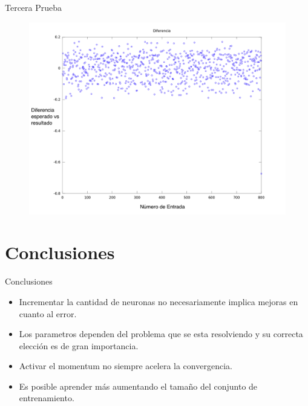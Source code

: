 \documentclass{beamer}
\begin{document}
\begin{frame}{Tercera Prueba}
\begin{figure}[H]
\begin{center}
\includegraphics[scale=0.20]{images/t2-14/diferencia_final.png}
\label{modelado}
\end{center}
\end{figure}
\end{frame}


\section{Conclusiones}
\begin{frame}{Conclusiones}

\begin{itemize}
\item Incrementar la cantidad de neuronas no necesariamente 
implica mejoras en cuanto al error.
\item Los parametros dependen del problema que se esta resolviendo y su correcta elección es de gran importancia.
\item Activar el momentum no siempre acelera la convergencia.
\item Es posible aprender más aumentando el tamaño del conjunto de entrenamiento.
\end{itemize}

\end{frame}
\end{document}
